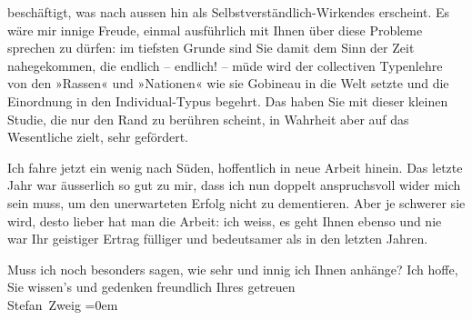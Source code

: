                beschäftigt, was nach aussen hin als Selbstverständlich-Wirkendes erscheint. Es wäre
               mir innige Freude, einmal ausführlich mit Ihnen über diese Probleme sprechen zu
               dürfen: im tiefsten Grunde sind Sie damit dem Sinn der Zeit nahegekommen, die endlich
               – endlich! – müde wird der collectiven Typenlehre von den »Rassen« und »Nationen« wie
               sie Gobineau in die Welt setzte und die  Einordnung in den \introOben{}Individual-\introOben{}Typus begehrt. Das haben Sie mit {\pb}dieser kleinen Studie, die nur den Rand zu berühren scheint, in Wahrheit
               aber auf das Wesentliche zielt, sehr gefördert.\pend
           
\pstart
           Ich fahre jetzt ein wenig nach Süden, hoffentlich in neue Arbeit hinein. Das letzte
               Jahr war äusserlich so gut zu mir, dass ich nun doppelt anspruchsvoll wider mich sein
               muss, um den unerwarteten Erfolg nicht zu dementieren. Aber je schwerer sie wird,
               desto lieber hat man die Arbeit: ich weiss, es geht Ihnen ebenso und nie war Ihr
               geistiger Ertrag fülliger und bedeutsamer als in den letzten Jahren.\pend
           
\pstart
           Muss ich noch besonders sagen, wie sehr und innig ich Ihnen anhänge? Ich hoffe,
               Sie wissen’s und gedenken freundlich Ihres getreuen{\\[\baselineskip]}\spacefill\mbox{Stefan Zweig}\pend
           \leftskip=0em{}\endnumbering{}  \newcommand{\dateiname}{L03673}\newcommand{\titel}{Stefan Zweig an Arthur Schnitzler, 4. 2. 1927}\newcommand{\editorInnen}{Selma Jahnke und Martin Anton Müller}

